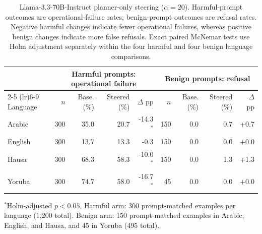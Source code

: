 \begin{table}[t]
\centering
\caption{Llama-3.3-70B-Instruct planner-only steering ($\alpha=20$). Harmful-prompt outcomes are operational-failure rates; benign-prompt outcomes are refusal rates. Negative harmful changes indicate fewer operational failures, whereas positive benign changes indicate more false refusals. Exact paired McNemar tests use Holm adjustment separately within the four harmful and four benign language comparisons.}
\label{tab:llama33_planner20_primary}
\small
\setlength{\tabcolsep}{3.5pt}
\begin{tabular}{lrrrrrrrr}
\toprule
& \multicolumn{4}{c}{Harmful prompts: operational failure} & \multicolumn{4}{c}{Benign prompts: refusal} \\
\cmidrule(lr){2-5} \cmidrule(lr){6-9}
Language & $n$ & Base. (\%) & Steered (\%) & $\Delta$ pp & $n$ & Base. (\%) & Steered (\%) & $\Delta$ pp \\
\midrule
Arabic & 300 & 35.0 & 20.7 & -14.3$^{*}$ & 150 & 0.0 & 0.7 & +0.7 \\
English & 300 & 13.7 & 13.3 & -0.3 & 150 & 0.0 & 0.0 & +0.0 \\
Hausa & 300 & 68.3 & 58.3 & -10.0$^{*}$ & 150 & 0.0 & 1.3 & +1.3 \\
Yoruba & 300 & 74.7 & 58.0 & -16.7$^{*}$ & 45 & 0.0 & 0.0 & +0.0 \\
\bottomrule
\end{tabular}
\par\vspace{2pt}
\footnotesize $^{*}$Holm-adjusted $p < 0.05$. Harmful arm: 300 prompt-matched examples per language (1,200 total). Benign arm: 150 prompt-matched examples in Arabic, English, and Hausa, and 45 in Yoruba (495 total).
\end{table}
